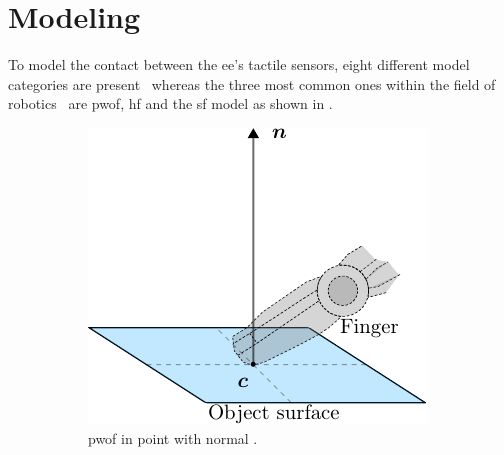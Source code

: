 
\chapter{Modeling} \label{ch:modeling}

To model the contact between the \gls{ee}'s tactile sensors, eight different model categories are present~\cite{articulated-hands-force-control-and-kinematic-issues} whereas the three most common ones within the field of robotics~\cite[Chapter 37]{handbook-of-robotics} are \gls{pwof}, \gls{hf} and the \gls{sf} model as shown in . \medskip

\begin{figure}[h]
	\centering
	\begin{subfigure}[b]{0.3\textwidth}
		\centering
		\includegraphics[width=\textwidth]{chapters/modeling/fig/contact-no-friction-crop.pdf}
		\caption{\gls{pwof} in point  with normal . \\\hspace{\textwidth} }
		\label{fig:pwof}
	\end{subfigure}
	\hfill
	\begin{subfigure}[b]{0.3\textwidth}
		\centering

\end{subfigure}
\end{figure}
